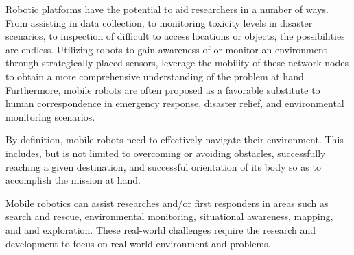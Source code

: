 




Robotic platforms have the potential to aid researchers in a number of ways.
From assisting in data collection, to monitoring toxicity levels in disaster
scenarios, to inspection of difficult to access locations or objects, the
possibilities are endless. Utilizing robots to gain awareness of or monitor an
environment through strategically placed sensors, leverage the mobility of these
network nodes to obtain a more comprehensive understanding of the problem at
hand. Furthermore, mobile robots are often proposed as a favorable substitute to
human correspondence in emergency response, disaster relief, and environmental
monitoring scenarios.

By definition, mobile robots need to effectively navigate their environment.
This includes, but is not limited to overcoming or avoiding obstacles,
successfully reaching a given destination, and successful orientation of its
body so as to accomplish the mission at hand.

Mobile robotics can assist researches and/or first responders in areas such as
search and rescue, environmental monitoring, situational awareness, mapping, and
and exploration. These real-world challenges require the research and
development to focus on real-world environment and problems.

